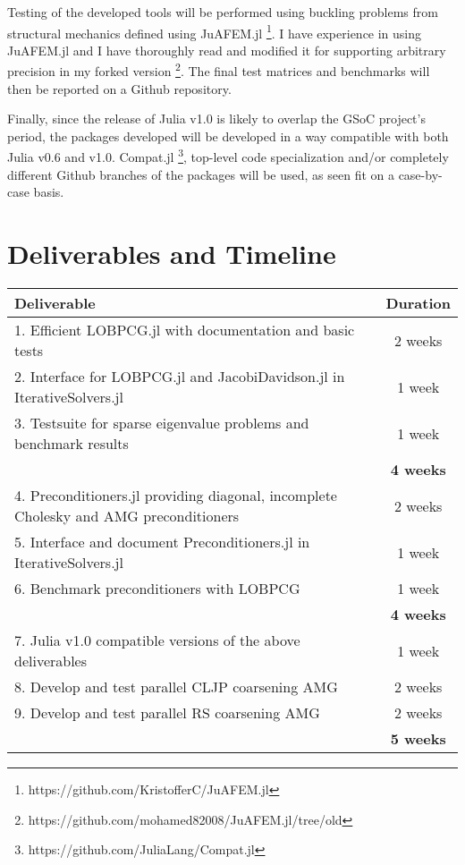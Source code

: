 \documentclass[12pt]{article}
\begin{document}
Testing of the developed tools will be performed using buckling problems from structural mechanics defined using JuAFEM.jl \footnote{https://github.com/KristofferC/JuAFEM.jl}. I have experience in using JuAFEM.jl and I have thoroughly read and modified it for supporting arbitrary precision in my forked version \footnote{https://github.com/mohamed82008/JuAFEM.jl/tree/old}. The final test matrices and benchmarks will then be reported on a Github repository.

Finally, since the release of Julia v1.0 is likely to overlap the GSoC project's period, the packages developed will be developed in a way compatible with both Julia v0.6 and v1.0. Compat.jl \footnote{https://github.com/JuliaLang/Compat.jl}, top-level code specialization and/or completely different Github branches of the packages will be used, as seen fit on a case-by-case basis.

\section{Deliverables and Timeline}

\begin{center}
 \begin{tabular}{||p{12cm} | c||}
 \hline
 \textbf{Deliverable} & \textbf{Duration} \\ [0.5ex] 
 \hline\hline
 1. Efficient LOBPCG.jl with documentation and basic tests & 2 weeks \\ 
 2. Interface for LOBPCG.jl and JacobiDavidson.jl in IterativeSolvers.jl & 1 week \\
 3. Testsuite for sparse eigenvalue problems and benchmark results & 1 week \\
 \hline
 \hline
  & \textbf{4 weeks} \\
 \hline
 \hline
 4. Preconditioners.jl providing diagonal, incomplete Cholesky and AMG preconditioners & 2 weeks \\
 5. Interface and document Preconditioners.jl in IterativeSolvers.jl & 1 week \\
 6. Benchmark preconditioners with LOBPCG & 1 week \\ [1ex] 
 \hline
 \hline
  & \textbf{4 weeks} \\
 \hline
 \hline
 7. Julia v1.0 compatible versions of the above deliverables & 1 week \\
 8. Develop and test parallel CLJP coarsening AMG & 2 weeks \\ 
 9. Develop and test parallel RS coarsening AMG & 2 weeks \\
 \hline
 \hline
  & \textbf{5 weeks} \\
 \hline
 \hline
\end{tabular}
\end{center}



\def\bibfont{\footnotesize}
\renewcommand{\bibsection}{\section{\bibname} \label{References}}


\end{document}
